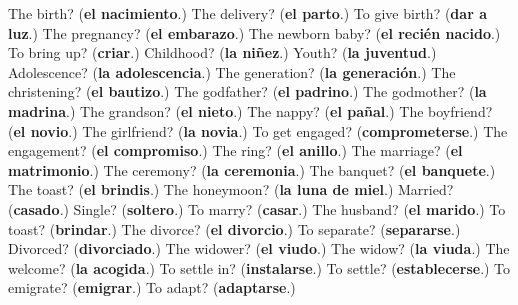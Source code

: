 \begin{tcolorbox}[breakable,colback=teal!4,colframe=teal!35!black,title={Before you move on}]
The birth? (\textbf{el nacimiento}.) The delivery? (\textbf{el parto}.) To give birth? (\textbf{dar a luz}.) The pregnancy? (\textbf{el embarazo}.) The newborn baby? (\textbf{el recién nacido}.) To bring up? (\textbf{criar}.) Childhood? (\textbf{la niñez}.) Youth? (\textbf{la juventud}.) Adolescence? (\textbf{la adolescencia}.) The generation? (\textbf{la generación}.) The christening? (\textbf{el bautizo}.) The godfather? (\textbf{el padrino}.) The godmother? (\textbf{la madrina}.) The grandson? (\textbf{el nieto}.) The nappy? (\textbf{el pañal}.) The boyfriend? (\textbf{el novio}.) The girlfriend? (\textbf{la novia}.) To get engaged? (\textbf{comprometerse}.) The engagement? (\textbf{el compromiso}.) The ring? (\textbf{el anillo}.) The marriage? (\textbf{el matrimonio}.) The ceremony? (\textbf{la ceremonia}.) The banquet? (\textbf{el banquete}.) The toast? (\textbf{el brindis}.) The honeymoon? (\textbf{la luna de miel}.) Married? (\textbf{casado}.) Single? (\textbf{soltero}.) To marry? (\textbf{casar}.) The husband? (\textbf{el marido}.) To toast? (\textbf{brindar}.) The divorce? (\textbf{el divorcio}.) To separate? (\textbf{separarse}.) Divorced? (\textbf{divorciado}.) The widower? (\textbf{el viudo}.) The widow? (\textbf{la viuda}.) The welcome? (\textbf{la acogida}.) To settle in? (\textbf{instalarse}.) To settle? (\textbf{establecerse}.) To emigrate? (\textbf{emigrar}.) To adapt? (\textbf{adaptarse}.)
\end{tcolorbox}
